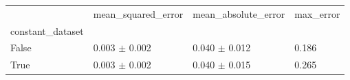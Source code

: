 \begin{tabular}{llll}
\toprule
 & mean_squared_error & mean_absolute_error & max_error \\
constant_dataset &  &  &  \\
\midrule
False & 0.003 $\pm$ 0.002 & 0.040 $\pm$ 0.012 & 0.186 \\
True & 0.003 $\pm$ 0.002 & 0.040 $\pm$ 0.015 & 0.265 \\
\bottomrule
\end{tabular}
